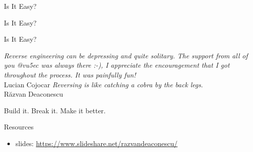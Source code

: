 \documentclass{simple}
\begin{document}
\begin{frame}{Is It Easy?}
\end{frame}

\begin{frame}{Is It Easy?}
\end{frame}

\begin{frame}{Is It Easy?}
\end{frame}

\begin{frame}{}
  \pause \textit{Reverse engineering can be depressing and quite solitary. The support from all of you @vu5ec was always there :-), I appreciate the encouragement that I got throughout the process. It was painfully fun!} \\
  \hfill Lucian Cojocar
  \vspace{1cm}
  \pause \textit{Reversing is like catching a cobra by the back legs.} \\
  \hfill Răzvan Deaconescu
\end{frame}

\begin{frame}{}
  \centering
  \LARGE{Build it. \pause Break it. \pause Make it better.}
\end{frame}

\begin{frame}{Resources}
  \begin{itemize}
    \item slides: \url{https://www.slideshare.net/razvandeaconescu/}
  \end{itemize}
\end{frame}
\end{document}
